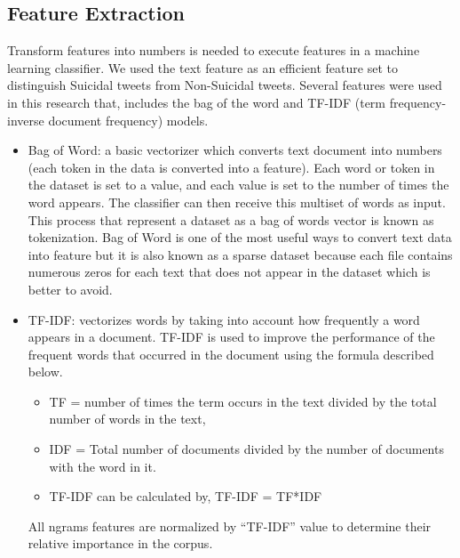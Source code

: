 \documentclass[11pt]{article}
\begin{document}
\subsection{Feature Extraction}
Transform features into numbers is needed to execute features in a machine learning classifier. We used the text feature as an efficient feature
set to distinguish Suicidal tweets from Non-Suicidal tweets. Several features were used in this research that, includes the bag of the word and TF-IDF (term frequency-inverse document frequency) models.
\begin{itemize}

 \item Bag of Word: a basic vectorizer which converts text document into numbers (each token in the data is converted into a feature). Each word or token in the dataset is set to a value, and each value is set to the number of times the word appears. The classifier can then receive this multiset of words as input. This process that represent a dataset as a bag of words vector is known as tokenization. Bag of Word is one of the most useful ways to convert text data into feature but it is also known as a sparse dataset because each file contains numerous zeros for each text that does not appear in the dataset which is better to avoid\cite{deepa2019sentiment}.


\item TF-IDF: vectorizes words by taking into account how frequently a word appears in a document. TF-IDF is used to improve the performance of the frequent words that occurred in the document using the formula described below.

\begin{itemize}
\item TF = number of times the term occurs in
the text divided by the total number of words in the text,
\item IDF = Total number of documents divided by the number of documents with the word in it.
\item TF-IDF can be calculated by,\newline
TF-IDF = TF*IDF \cite{deepa2019sentiment}
\end{itemize}
All ngrams features are normalized by “TF-IDF” value to determine their relative importance in the corpus.

\begin{itemize}


\end{itemize}
\end{itemize}
\end{document}
